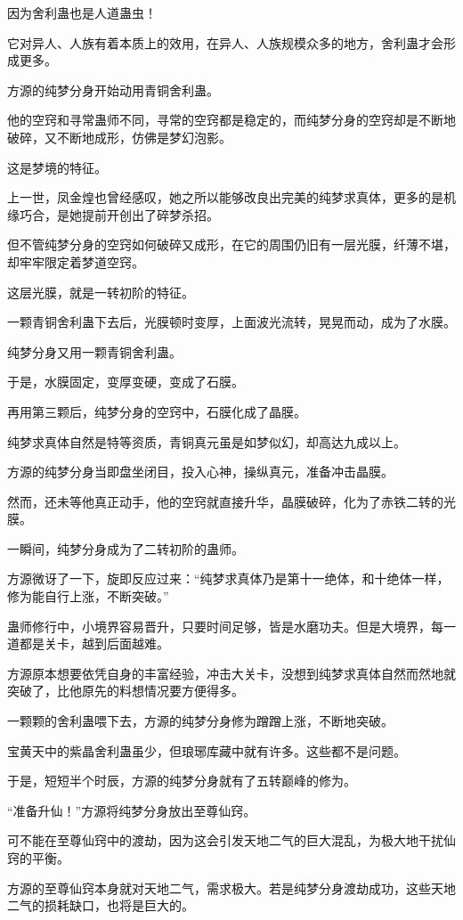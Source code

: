 \begin{this_body}
因为舍利蛊也是人道蛊虫！

它对异人、人族有着本质上的效用，在异人、人族规模众多的地方，舍利蛊才会形成更多。

方源的纯梦分身开始动用青铜舍利蛊。

他的空窍和寻常蛊师不同，寻常的空窍都是稳定的，而纯梦分身的空窍却是不断地破碎，又不断地成形，仿佛是梦幻泡影。

这是梦境的特征。

上一世，凤金煌也曾经感叹，她之所以能够改良出完美的纯梦求真体，更多的是机缘巧合，是她提前开创出了碎梦杀招。

但不管纯梦分身的空窍如何破碎又成形，在它的周围仍旧有一层光膜，纤薄不堪，却牢牢限定着梦道空窍。

这层光膜，就是一转初阶的特征。

一颗青铜舍利蛊下去后，光膜顿时变厚，上面波光流转，晃晃而动，成为了水膜。

纯梦分身又用一颗青铜舍利蛊。

于是，水膜固定，变厚变硬，变成了石膜。

再用第三颗后，纯梦分身的空窍中，石膜化成了晶膜。

纯梦求真体自然是特等资质，青铜真元虽是如梦似幻，却高达九成以上。

方源的纯梦分身当即盘坐闭目，投入心神，操纵真元，准备冲击晶膜。

然而，还未等他真正动手，他的空窍就直接升华，晶膜破碎，化为了赤铁二转的光膜。

一瞬间，纯梦分身成为了二转初阶的蛊师。

方源微讶了一下，旋即反应过来：“纯梦求真体乃是第十一绝体，和十绝体一样，修为能自行上涨，不断突破。”

蛊师修行中，小境界容易晋升，只要时间足够，皆是水磨功夫。但是大境界，每一道都是关卡，越到后面越难。

方源原本想要依凭自身的丰富经验，冲击大关卡，没想到纯梦求真体自然而然地就突破了，比他原先的料想情况要方便得多。

一颗颗的舍利蛊喂下去，方源的纯梦分身修为蹭蹭上涨，不断地突破。

宝黄天中的紫晶舍利蛊虽少，但琅琊库藏中就有许多。这些都不是问题。

于是，短短半个时辰，方源的纯梦分身就有了五转巅峰的修为。

“准备升仙！”方源将纯梦分身放出至尊仙窍。

可不能在至尊仙窍中的渡劫，因为这会引发天地二气的巨大混乱，为极大地干扰仙窍的平衡。

方源的至尊仙窍本身就对天地二气，需求极大。若是纯梦分身渡劫成功，这些天地二气的损耗缺口，也将是巨大的。


\end{this_body}
